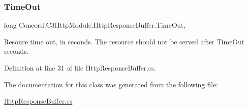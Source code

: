 \subsubsection{\texorpdfstring{TimeOut}{TimeOut}}
{\footnotesize\ttfamily long Concord.\+C3\+Http\+Module.\+Http\+Response\+Buffer.\+Time\+Out\hspace{0.3cm}{\ttfamily [get]}, {\ttfamily [set]}}



Resoure time out, in seconds. The resource should not be served after Time\+Out seconds. 



Definition at line 31 of file Http\+Response\+Buffer.\+cs.



The documentation for this class was generated from the following file\+:\begin{DoxyCompactItemize}
\item 
\mbox{\hyperlink{_http_response_buffer_8cs}{Http\+Response\+Buffer.\+cs}}\end{DoxyCompactItemize}
